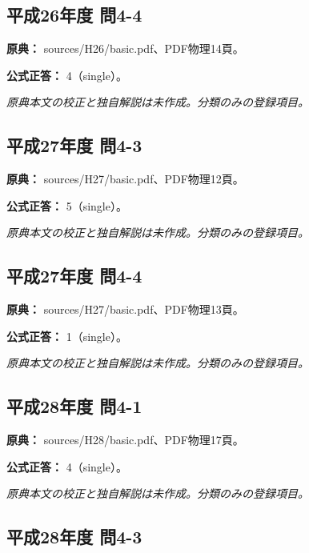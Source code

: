 \subsection{平成26年度 問4-4}
\label{q:h26-reg-basic-4-4}

\noindent\textbf{原典：} sources/H26/basic.pdf、PDF物理14頁。

\textbf{公式正答：} 4（single）。

\par\textit{原典本文の校正と独自解説は未作成。分類のみの登録項目。}

\subsection{平成27年度 問4-3}
\label{q:h27-reg-basic-4-3}

\noindent\textbf{原典：} sources/H27/basic.pdf、PDF物理12頁。

\textbf{公式正答：} 5（single）。

\par\textit{原典本文の校正と独自解説は未作成。分類のみの登録項目。}

\subsection{平成27年度 問4-4}
\label{q:h27-reg-basic-4-4}

\noindent\textbf{原典：} sources/H27/basic.pdf、PDF物理13頁。

\textbf{公式正答：} 1（single）。

\par\textit{原典本文の校正と独自解説は未作成。分類のみの登録項目。}

\subsection{平成28年度 問4-1}
\label{q:h28-reg-basic-4-1}

\noindent\textbf{原典：} sources/H28/basic.pdf、PDF物理17頁。

\textbf{公式正答：} 4（single）。

\par\textit{原典本文の校正と独自解説は未作成。分類のみの登録項目。}

\subsection{平成28年度 問4-3}
\label{q:h28-reg-basic-4-3}

